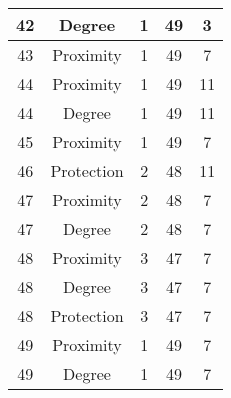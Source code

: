 \documentclass[results.tex]{subfiles}
\begin{document}
\begin{center}
\begin{tabular}{| c || c | c | c | c |}
            \hline
            42                      & Degree                       & 1                      & 49                      & 3                    \\
            \hline
            43                      & Proximity                    & 1                      & 49                      & 7                    \\
            \hline
            44                      & Proximity                    & 1                      & 49                      & 11                   \\
            \hline
            44                      & Degree                       & 1                      & 49                      & 11                   \\
            \hline
            45                      & Proximity                    & 1                      & 49                      & 7                    \\
            \hline
            46                      & Protection                   & 2                      & 48                      & 11                   \\
            \hline
            47                      & Proximity                    & 2                      & 48                      & 7                    \\
            \hline
            47                      & Degree                       & 2                      & 48                      & 7                    \\
            \hline
            48                      & Proximity                    & 3                      & 47                      & 7                    \\
            \hline
            48                      & Degree                       & 3                      & 47                      & 7                    \\
            \hline
            48                      & Protection                   & 3                      & 47                      & 7                    \\
            \hline
            49                      & Proximity                    & 1                      & 49                      & 7                    \\
            \hline
            49                      & Degree                       & 1                      & 49                      & 7                    \\
            \hline
        \end{tabular}
    \end{center}
\end{document}
